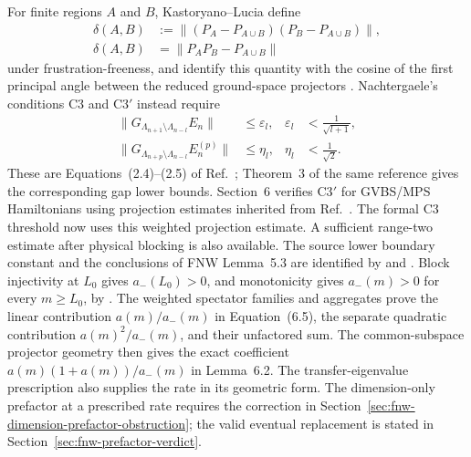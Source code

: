 \documentclass{article}
\begin{document}
For finite regions $A$ and $B$, Kastoryano--Lucia define
\begin{align}
    \delta(A,B)
     & :=
    \lVert(P_A-P_{A\cup B})(P_B-P_{A\cup B})\rVert,
    \label{eq:cpgsv21_martingale_overlap_kl_defect_definition} \\
    \delta(A,B)
     & =\lVert P_AP_B-P_{A\cup B}\rVert
    \label{eq:cpgsv21_martingale_overlap_kl_defect_product}
\end{align}
under frustration-freeness, and identify this quantity with the cosine of the
first principal angle between the reduced ground-space projectors
\cite[Definition~2 and Remark~2]{Kastoryano2018Martingale}. Nachtergaele's
conditions C3 and C3$'$ instead require
\begin{align}
    \lVert G_{\Lambda_{n+1}\setminus\Lambda_{n-l}}E_n\rVert
     & \leq\varepsilon_l,
     &
    \varepsilon_l
     & <\frac{1}{\sqrt{l+1}},
    \label{eq:cpgsv21_martingale_overlap_nachtergaele_c3} \\
    \lVert G_{\Lambda_{n+p}\setminus\Lambda_{n-l}}E_n^{(p)}\rVert
     & \leq\eta_l,
     &
    \eta_l
     & <\frac{1}{\sqrt{2}}.
    \label{eq:cpgsv21_martingale_overlap_nachtergaele_c3_prime}
\end{align}
These are Equations~(2.4)--(2.5) of
Ref.~\cite{Nachtergaele1996Spectral}; Theorem~3 of the same reference gives
the corresponding gap lower bounds. Section~6 verifies C3$'$ for GVBS/MPS
Hamiltonians using projection estimates inherited from
Ref.~\cite{Fannes1992Finitely}. The formal C3 threshold now uses this
weighted projection estimate. A sufficient range-two estimate after physical
blocking is also available. The source lower
boundary constant and the conclusions of FNW Lemma~5.3 are identified by
 and
. Block injectivity at
$L_0$ gives $a_-(L_0)>0$, and monotonicity gives $a_-(m)>0$ for every
$m\geq L_0$, by
.
The weighted spectator families and aggregates prove the linear contribution
$a(m)/a_-(m)$ in Equation~(6.5), the separate quadratic contribution
$a(m)^2/a_-(m)$, and their unfactored sum. The common-subspace projector
geometry then gives the exact coefficient $a(m)(1+a(m))/a_-(m)$ in
Lemma~6.2. The transfer-eigenvalue prescription also supplies the rate in
its geometric form. The dimension-only prefactor at a prescribed rate requires
the correction in Section~\ref{sec:fnw-dimension-prefactor-obstruction}; the
valid eventual replacement is stated in Section~\ref{sec:fnw-prefactor-verdict}.
\end{document}
